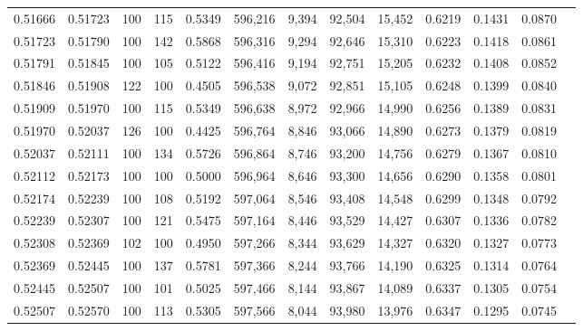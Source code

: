 \begin{tabular}{rrrrrrrrrrrrr}
0.51666 & 0.51723 &    100 & 115 &                                     0.5349 & 596,216 &   9,394 &  92,504 &  15,452 & 0.6219 & 0.1431 & 0.0870 \\
0.51723 & 0.51790 &    100 & 142 &                                     0.5868 & 596,316 &   9,294 &  92,646 &  15,310 & 0.6223 & 0.1418 & 0.0861 \\
0.51791 & 0.51845 &    100 & 105 &                                     0.5122 & 596,416 &   9,194 &  92,751 &  15,205 & 0.6232 & 0.1408 & 0.0852 \\
0.51846 & 0.51908 &    122 & 100 &                                     0.4505 & 596,538 &   9,072 &  92,851 &  15,105 & 0.6248 & 0.1399 & 0.0840 \\
0.51909 & 0.51970 &    100 & 115 &                                     0.5349 & 596,638 &   8,972 &  92,966 &  14,990 & 0.6256 & 0.1389 & 0.0831 \\
0.51970 & 0.52037 &    126 & 100 &                                     0.4425 & 596,764 &   8,846 &  93,066 &  14,890 & 0.6273 & 0.1379 & 0.0819 \\
0.52037 & 0.52111 &    100 & 134 &                                     0.5726 & 596,864 &   8,746 &  93,200 &  14,756 & 0.6279 & 0.1367 & 0.0810 \\
0.52112 & 0.52173 &    100 & 100 &                                     0.5000 & 596,964 &   8,646 &  93,300 &  14,656 & 0.6290 & 0.1358 & 0.0801 \\
0.52174 & 0.52239 &    100 & 108 &                                     0.5192 & 597,064 &   8,546 &  93,408 &  14,548 & 0.6299 & 0.1348 & 0.0792 \\
0.52239 & 0.52307 &    100 & 121 &                                     0.5475 & 597,164 &   8,446 &  93,529 &  14,427 & 0.6307 & 0.1336 & 0.0782 \\
0.52308 & 0.52369 &    102 & 100 &                                     0.4950 & 597,266 &   8,344 &  93,629 &  14,327 & 0.6320 & 0.1327 & 0.0773 \\
0.52369 & 0.52445 &    100 & 137 &                                     0.5781 & 597,366 &   8,244 &  93,766 &  14,190 & 0.6325 & 0.1314 & 0.0764 \\
0.52445 & 0.52507 &    100 & 101 &                                     0.5025 & 597,466 &   8,144 &  93,867 &  14,089 & 0.6337 & 0.1305 & 0.0754 \\
0.52507 & 0.52570 &    100 & 113 &                                     0.5305 & 597,566 &   8,044 &  93,980 &  13,976 & 0.6347 & 0.1295 & 0.0745 \\

\end{tabular}
